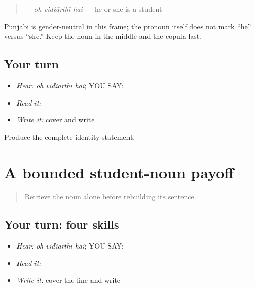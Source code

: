 \begin{grammarlens}[title={Grammar Lens}]
\begin{quote}
\textbf{  } — \emph{oh vidiārthī hai} — he or she is a student
\end{quote}

Punjabi \textbf{} is gender-neutral in this frame; the pronoun itself does not mark “he” versus “she.” Keep the noun in the middle and the copula last.
\end{grammarlens}

\subsection*{Your turn}
\begin{itemize}
\raggedright
  \item \emph{Hear:} \emph{oh vidiārthī hai}; YOU SAY: \textbf{  }
  \item \emph{Read it:} \textbf{  }
  \item \emph{Write it:} cover and write \textbf{  }
\end{itemize}

\begin{tcolorbox}[breakable,colback=teal!4,colframe=teal!35!black,title={Before you move on}]
Produce the complete identity statement.
\end{tcolorbox}
\section[\texorpdfstring{\pa{ਉਹ} \pa{ਵਿਦਿਆਰਥੀ} \pa{ਹੈ} (oh vidiarthii hai)}{ਉਹ ਵਿਦਿਆਰਥੀ ਹੈ (oh vidiarthii hai)}]{A bounded student-noun payoff}

\label{lesson:PA-C194-payoff}



\begin{quote}
Retrieve the noun alone before rebuilding its sentence.
\end{quote}

\subsection*{Your turn: four skills}
\begin{itemize}
\raggedright
  \item \emph{Hear:} \emph{oh vidiārthī hai}; YOU SAY: \textbf{  }
  \item \emph{Read it:} \textbf{  }
  \item \emph{Write it:} cover the line and write \textbf{  }
\end{itemize}


